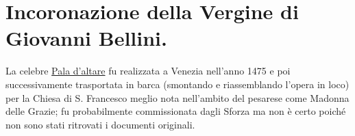 \documentclass[12pt,a4paper]{article}
\begin{document}
	\section{Incoronazione della Vergine di Giovanni Bellini.}
	La celebre \underline{Pala d'altare} fu realizzata a Venezia nell'anno 1475 e poi successivamente trasportata in barca (smontando e riassemblando l'opera in loco) per la Chiesa di S. Francesco meglio nota nell'ambito del pesarese come Madonna delle Grazie; fu probabilmente commissionata dagli Sforza ma non è certo poiché non sono stati ritrovati i documenti originali.\\
	
\end{document}
